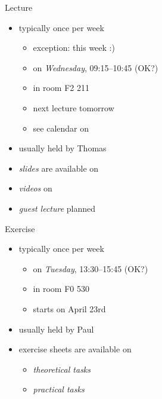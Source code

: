 \begin{frame}{\myframetitle}
	\myframeicon{\fancyqr[image={\pic[width=10mm]{moodle-calendar}}]{}} %
	\begin{fancycolumns}
		\begin{definition}{Lecture}
			\begin{itemize}
				\item typically once per week
				\begin{itemize}
					\item exception: this week :)
					\item on \emph{Wednesday}, 09:15--10:45 (OK?)
					\item in room F2 211
					\item next lecture tomorrow
					\item see calendar on \Panda
				\end{itemize}
				\item usually held by Thomas
				\item \emph{slides} are available on \Panda
				\item \emph{videos} on \Youtube
				\item \emph{guest lecture} planned
			\end{itemize}
		\end{definition}
	\nextcolumn
		\begin{example}{Exercise}
			\begin{itemize}
				\item typically once per week
				\begin{itemize}
					\item on \emph{Tuesday}, 13:30--15:45 (OK?)
					\item in room F0 530
					\item starts on April 23rd
				\end{itemize}
				\item usually held by Paul
				\item exercise sheets are available on \Panda
				\begin{itemize}
					\item \emph{theoretical tasks}
					\item \emph{practical tasks}
				\end{itemize}
			\end{itemize}
		\end{example}
	\end{fancycolumns}
\end{frame}

